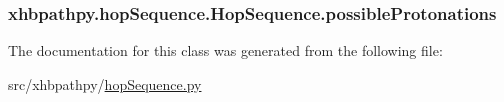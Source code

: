 \hypertarget{classxhbpathpy_1_1hop_sequence_1_1_hop_sequence_ae1ae68a0b84510f0eda0b61b7c533538}{
\subsubsection[{possible\-Protonations}]{\setlength{\rightskip}{0pt plus 5cm}xhbpathpy.\-hop\-Sequence.\-Hop\-Sequence.\-possible\-Protonations}}\label{classxhbpathpy_1_1hop_sequence_1_1_hop_sequence_ae1ae68a0b84510f0eda0b61b7c533538}


The documentation for this class was generated from the following file\-:\begin{DoxyCompactItemize}
\item 
src/xhbpathpy/\hyperlink{hop_sequence_8py}{hop\-Sequence.\-py}\end{DoxyCompactItemize}
